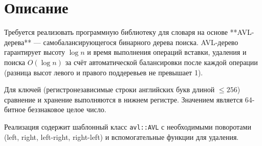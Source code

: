 \section{Описание}
Требуется реализовать программную библиотеку для словаря на основе **AVL-дерева** — самобалансирующегося бинарного дерева поиска. AVL-дерево гарантирует высоту $\log n$ и время выполнения операций вставки, удаления и поиска $O(\log n)$ за счёт автоматической балансировки после каждой операции (разница высот левого и правого поддеревьев не превышает 1).

Для ключей (регистронезависимые строки английских букв длиной $\le 256$) сравнение и хранение выполняются в нижнем регистре. Значением является 64-битное беззнаковое целое число.

Реализация содержит шаблонный класс \texttt{avl::AVL} с необходимыми поворотами (left, right, left-right, right-left) и вспомогательные функции для удаления.

